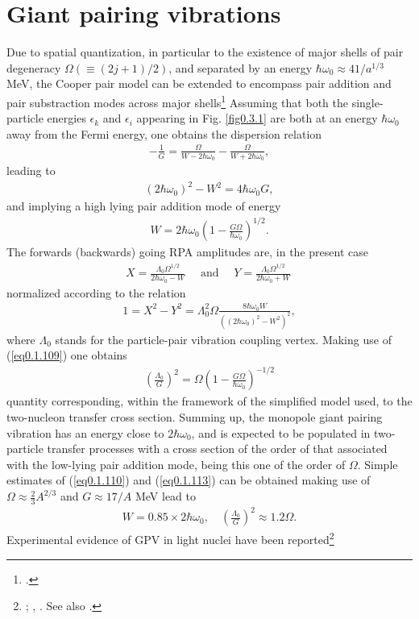 \section{Giant pairing vibrations}\label{Sect2.6}
Due to spatial quantization, in particular to the existence of major shells of pair degeneracy $\Omega(\equiv(2j+1)/2)$, and separated by an energy $\hbar\omega_0\approx41/a^{1/3}$ MeV, the Cooper pair model can be extended to encompass pair addition and pair substraction modes across major shells\footnote{\cite{Broglia:77}.} Assuming that both the single-particle energies $\epsilon_k$ and $\epsilon_i$ appearing in Fig. \ref{fig0.3.1} are both at an energy    $\hbar\omega_0$ away from the Fermi energy, one obtains the dispersion relation 
\begin{align}\label{eq0.1.108}
-\frac{1}{G}=\frac{\Omega}{W-2\hbar\omega_0}-\frac{\Omega}{W+2\hbar\omega_0},
\end{align}
leading to
\begin{align}\label{eq0.1.109}
(2\hbar\omega_0)^2-W^2=4\hbar\omega_0G,
\end{align}
and implying a high lying pair addition mode of energy
\begin{align}\label{eq0.1.110}
W=2\hbar\omega_0\left(1-\frac{G\Omega}{\hbar\omega_0}\right)^{1/2}.
\end{align}
The forwards (backwards) going RPA amplitudes are, in the present case
\begin{align}\label{eq0.1.111}
X=\frac{\Lambda_0\Omega^{1/2}}{2\hbar\omega_0-W}\quad\text{ and      }\quad Y=\frac{\Lambda_0\Omega^{1/2}}{2\hbar\omega_0+W}\
\end{align}
normalized according to the relation 
\begin{align}\label{eq0.1.112}
1=X^2-Y^2=\Lambda^2_0\Omega\frac{8\hbar\omega_0W}{\left((2\hbar\omega_0)^2-W^2\right)^2},
\end{align}
where $\Lambda_0$ stands for the particle-pair vibration coupling vertex. Making use of (\ref{eq0.1.109}) one obtains
\begin{align}\label{eq0.1.113}
\left(\frac{\Lambda_0}{G}\right)^2=\Omega\left(1-\frac{G\Omega}{\hbar\omega_0}\right)^{-1/2}
\end{align}
quantity corresponding, within the framework of the simplified model used, to the two-nucleon transfer cross section. Summing up, the monopole giant pairing vibration has an energy close to $2\hbar\omega_0$, and is expected to be populated in two-particle transfer processes with a cross section of the order of that associated with the low-lying pair addition mode, being this one of the order of $\Omega$. Simple estimates of (\ref{eq0.1.110}) and (\ref{eq0.1.113}) can be obtained making use of $\Omega\approx\frac{2}{3}A^{2/3}$
and $G\approx17/A$ MeV lead to
\begin{align}\label{eq0.1.114}
W=0.85\times2\hbar\omega_0,\quad\left(\frac{\Lambda_0}{G}\right)^2\approx1.2 \Omega.
\end{align}
Experimental evidence of GPV in light nuclei have been reported\footnote{\cite{Cappuzzello:15}; \cite{Cavallaro:19},  \cite{Bortignon:16}. See also \cite{Laskin:16,Betan:02,Dussel:09,Mouginot:11,Khan:04}.}
